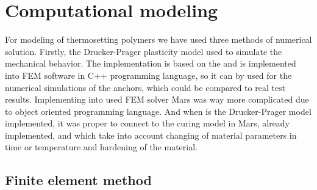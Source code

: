\section{Computational modeling}
\indent

For modeling of thermosetting polymers we have used three methods of numerical solution. Firstly, the Drucker-Prager plasticity model used to simulate the mechanical behavior. The implementation is based on the \cite{geofem} and is implemented into FEM software in C++ programming language, so it can by used for the numerical simulations of the anchors, which could be compared to real test results. Implementing into used FEM solver Mars \cite{mars} was way more complicated due to object oriented programming language. And when is the Drucker-Prager model implemented, it was proper to connect to the  curing model in Mars, already implemented, and which take into account changing of material parameters in time or temperature and hardening of the material.

\subsection{Finite element method}
\indent

